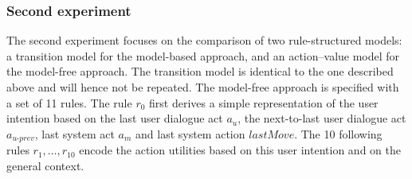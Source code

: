 \subsubsection*{Second experiment}

The second experiment focuses on the comparison of two rule-structured models: a transition model for the model-based approach, and an action--value model for the model-free approach. The transition model is identical to the one described above and will hence not be repeated.  The model-free approach is specified with a set of 11 rules.  The rule $r_0$ first derives a simple representation of the user intention based on the last user dialogue act $a_u$, the next-to-last user dialogue act $a_{u\mbox{-}prev}$, last system act $a_m$ and last system action $\mathit{lastMove}$.  The 10 following rules $r_1, \dots , r_10$ encode the action utilities based on this user intention and on the general context. 

